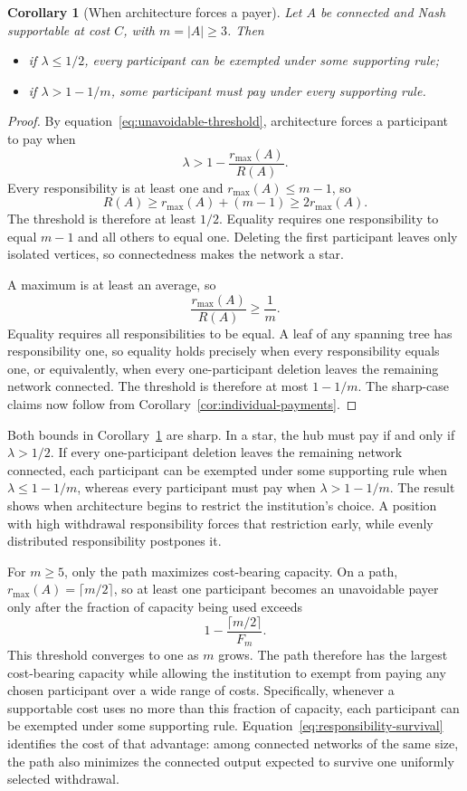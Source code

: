 \documentclass[preprint,12pt,authoryear]{elsarticle}
\newtheorem{corollary}{Corollary}
\begin{document}
\begin{corollary}[When architecture forces a payer]
\label{cor:unavoidable-threshold}
Let \(A\) be connected and Nash supportable at cost \(C\), with
\(m=|A|\geq3\). Then
\begin{itemize}
  \item[(i)] if \(\lambda\leq1/2\), every participant can be exempted under
  some supporting rule;
  \item[(ii)] if \(\lambda>1-1/m\), some participant must pay under every
  supporting rule.
\end{itemize}
\end{corollary}

\begin{proof}
By equation~\eqref{eq:unavoidable-threshold}, architecture forces a
participant to pay when
\[
 \lambda>1-\frac{r_{\max}(A)}{R(A)}.
\]
Every responsibility is at least one and \(r_{\max}(A)\leq m-1\), so
\[
 R(A)\geq r_{\max}(A)+(m-1)\geq2r_{\max}(A).
\]
The threshold is therefore at least \(1/2\). Equality requires one
responsibility to equal \(m-1\) and all others to equal one. Deleting the
first participant leaves only isolated vertices, so connectedness makes the
network a star.

A maximum is at least an average, so
\[
 \frac{r_{\max}(A)}{R(A)}\geq\frac1m.
\]
Equality requires all responsibilities to be equal. A leaf of any spanning
tree has responsibility one, so equality holds precisely when every
responsibility equals one, or equivalently, when every one-participant
deletion leaves the remaining network connected. The threshold is therefore
at most \(1-1/m\). The sharp-case claims now follow from
Corollary~\ref{cor:individual-payments}.
\end{proof}

Both bounds in Corollary~\ref{cor:unavoidable-threshold} are sharp. In a star,
the hub must pay if and only if \(\lambda>1/2\). If every one-participant
deletion leaves the remaining network connected, each participant can be
exempted under some supporting rule when \(\lambda\leq1-1/m\), whereas every
participant must pay when \(\lambda>1-1/m\). The result shows when architecture
begins to restrict the institution's choice. A position with high withdrawal
responsibility forces that restriction early, while evenly distributed responsibility
postpones it.



For \(m\geq5\), only the path maximizes cost-bearing capacity. On a path,
\(r_{\max}(A)=\lceil m/2\rceil\), so at least one participant becomes an
unavoidable payer only after the fraction of capacity being used exceeds
\[
 1-\frac{\lceil m/2\rceil}{F_m}.
\]
This threshold converges to one as \(m\) grows. The path therefore has the
largest cost-bearing capacity while allowing the institution to exempt from paying any
chosen participant over a wide range of costs. Specifically, whenever a
supportable cost uses no more than this fraction of capacity, each participant
can be exempted under some supporting rule.
Equation~\eqref{eq:responsibility-survival}
identifies the cost of that advantage: among connected networks of the same
size, the path also minimizes the connected output expected to survive one
uniformly selected withdrawal.
\end{document}
